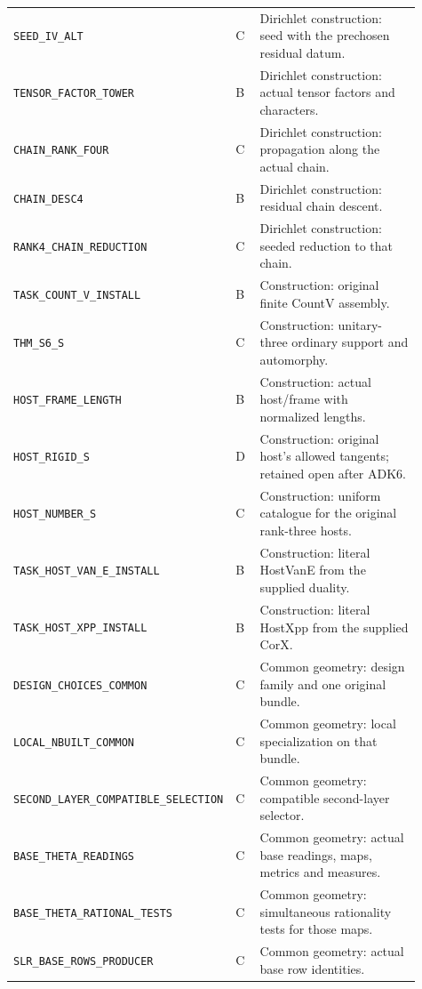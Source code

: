 \documentclass[11pt,a4paper]{article}
\numberwithin{equation}{section}
\theoremstyle{remark}\newtheorem{remark}[theorem]{Remark}
\begin{document}
\begin{longtable}{p{0.44\linewidth}p{0.06\linewidth}p{0.41\linewidth}}
\texttt{SEED\_\allowbreak IV\_\allowbreak ALT} & C & Dirichlet construction: seed with the prechosen residual datum.\\
\texttt{TENSOR\_\allowbreak FACTOR\_\allowbreak TOWER} & B & Dirichlet construction: actual tensor factors and characters.\\
\texttt{CHAIN\_\allowbreak RANK\_\allowbreak FOUR} & C & Dirichlet construction: propagation along the actual chain.\\
\texttt{CHAIN\_\allowbreak DESC4} & B & Dirichlet construction: residual chain descent.\\
\texttt{RANK4\_\allowbreak CHAIN\_\allowbreak REDUCTION} & C & Dirichlet construction: seeded reduction to that chain.\\
\texttt{TASK\_\allowbreak COUNT\_\allowbreak V\_\allowbreak INSTALL} & B & Construction: original finite CountV assembly.\\
\texttt{THM\_\allowbreak S6\_\allowbreak S} & C & Construction: unitary-three ordinary support and automorphy.\\
\texttt{HOST\_\allowbreak FRAME\_\allowbreak LENGTH} & B & Construction: actual host/frame with normalized lengths.\\
\texttt{HOST\_\allowbreak RIGID\_\allowbreak S} & D & Construction: original host's allowed tangents; retained open after ADK6.\\
\texttt{HOST\_\allowbreak NUMBER\_\allowbreak S} & C & Construction: uniform catalogue for the original rank-three hosts.\\
\texttt{TASK\_\allowbreak HOST\_\allowbreak VAN\_\allowbreak E\_\allowbreak INSTALL} & B & Construction: literal HostVanE from the supplied duality.\\
\texttt{TASK\_\allowbreak HOST\_\allowbreak XPP\_\allowbreak INSTALL} & B & Construction: literal HostXpp from the supplied CorX.\\
\texttt{DESIGN\_\allowbreak CHOICES\_\allowbreak COMMON} & C & Common geometry: design family and one original bundle.\\
\texttt{LOCAL\_\allowbreak NBUILT\_\allowbreak COMMON} & C & Common geometry: local specialization on that bundle.\\
\texttt{SECOND\_\allowbreak LAYER\_\allowbreak COMPATIBLE\_\allowbreak SELECTION} & C & Common geometry: compatible second-layer selector.\\
\texttt{BASE\_\allowbreak THETA\_\allowbreak READINGS} & C & Common geometry: actual base readings, maps, metrics and measures.\\
\texttt{BASE\_\allowbreak THETA\_\allowbreak RATIONAL\_\allowbreak TESTS} & C & Common geometry: simultaneous rationality tests for those maps.\\
\texttt{SLR\_\allowbreak BASE\_\allowbreak ROWS\_\allowbreak PRODUCER} & C & Common geometry: actual base row identities.\\
\end{longtable}
\end{document}
